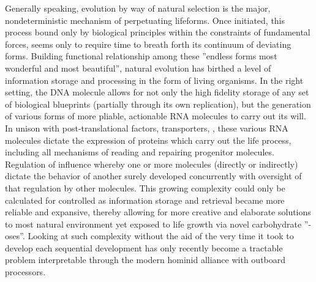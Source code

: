 Generally speaking, evolution by way of natural selection is the major, nondeterministic mechanism of perpetuating lifeforms. Once initiated, this process bound only by biological principles within the constraints of fundamental forces, seems only to require time to breath forth its continuum of deviating forms. Building functional relationship among these ''endless forms most wonderful and most beautiful''\citep{darwin1869origin}, natural evolution has birthed a level of information storage and processing in the form of living organisms. In the right setting, the DNA molecule allows for not only the high fidelity storage of any set of biological blueprints (partially through its own replication), but the generation of various forms of more pliable, actionable RNA molecules to carry out its will\cite{roeder1991complexities}. In unison with post-translational factors, transporters, \etc, these various RNA molecules dictate the expression of proteins which carry out the life process, including all mechanisms of reading and repairing progenitor molecules. Regulation of influence whereby one or more molecules (directly or indirectly) dictate the behavior of another surely developed concurrently with oversight of that regulation by other molecules. This growing complexity could only be calculated for controlled as information storage and retrieval became more reliable and expansive, thereby allowing for more creative and elaborate solutions to most natural environment yet exposed to life \eg growth via novel carbohydrate ''-oses''. Looking at such complexity without the aid of the very time it took to develop each sequential development has only recently become a tractable problem interpretable through the modern hominid alliance with outboard processors.

